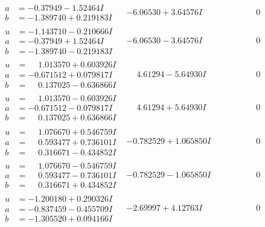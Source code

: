 \documentclass[1p]{elsarticle_modified}
\theoremstyle{definition}
\begin{document}
$$\begin{array}{c|c|c}
\begin{aligned}
a &= -0.37949 - 1.52464 I \\
b &= -1.389740 + 0.219183 I\end{aligned}
 & -6.06530 + 3.64576 I & \phantom{-0.000000 } 0 \\ \hline\begin{aligned}
u &= -1.143710 - 0.210666 I \\
a &= -0.37949 + 1.52464 I \\
b &= -1.389740 - 0.219183 I\end{aligned}
 & -6.06530 - 3.64576 I & \phantom{-0.000000 } 0 \\ \hline\begin{aligned}
u &= \phantom{-}1.013570 + 0.603926 I \\
a &= -0.671512 + 0.079817 I \\
b &= \phantom{-}0.137025 - 0.636866 I\end{aligned}
 & \phantom{-}4.61294 - 5.64930 I & \phantom{-0.000000 } 0 \\ \hline\begin{aligned}
u &= \phantom{-}1.013570 - 0.603926 I \\
a &= -0.671512 - 0.079817 I \\
b &= \phantom{-}0.137025 + 0.636866 I\end{aligned}
 & \phantom{-}4.61294 + 5.64930 I & \phantom{-0.000000 } 0 \\ \hline\begin{aligned}
u &= \phantom{-}1.076670 + 0.546759 I \\
a &= \phantom{-}0.593477 + 0.736101 I \\
b &= \phantom{-}0.316671 - 0.434852 I\end{aligned}
 & -0.782529 + 1.065850 I & \phantom{-0.000000 } 0 \\ \hline\begin{aligned}
u &= \phantom{-}1.076670 - 0.546759 I \\
a &= \phantom{-}0.593477 - 0.736101 I \\
b &= \phantom{-}0.316671 + 0.434852 I\end{aligned}
 & -0.782529 - 1.065850 I & \phantom{-0.000000 } 0 \\ \hline\begin{aligned}
u &= -1.200180 + 0.290326 I \\
a &= -0.837459 - 0.455709 I \\
b &= -1.305520 + 0.094166 I\end{aligned}
 & -2.69997 + 4.12763 I & \phantom{-0.000000 } 0 \\ \hline\begin{aligned}

\end{aligned}
\end{array}$$
\end{document}
